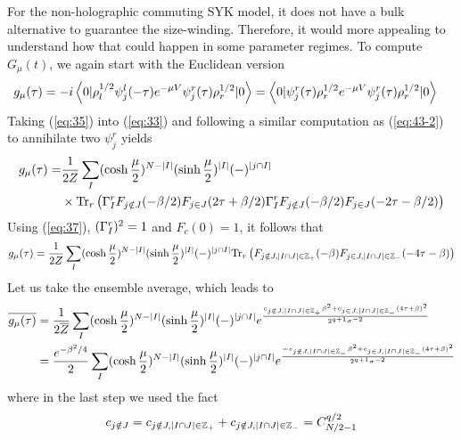 \documentclass[11pt]{article}
\renewcommand{\>}{\rangle}
\newcommand{\<}{\langle}
\begin{document}
For the non-holographic commuting SYK model, it does not have a bulk
alternative to guarantee the size-winding. Therefore, it would more
appealing to understand how that could happen in some parameter regimes.
To compute $G_{\mu}(t)$, we again start with the Euclidean version
\begin{align}
g_{\mu}(\tau) & =-i\left\langle 0|\rho_{l}^{1/2}\psi_{j}^{l}(-\tau)e^{-\mu V}\psi_{j}^{r}(\tau)\rho_{r}^{1/2}|0\right\rangle=\left\langle 0|\psi_{j}^{r}(\tau)\rho_{r}^{1/2}e^{-\mu V}\psi_{j}^{r}(\tau)\rho_{r}^{1/2}|0\right\rangle\label{eq:33}
\end{align}
Taking (\ref{eq:35}) into (\ref{eq:33}) and following a similar
computation as (\ref{eq:43-2}) to annihilate two $\psi_{j}^{r}$
yields
\begin{align}
g_{\mu}(\tau)= & \frac{1}{2Z}\sum_{I}(\cosh\frac{\mu}{2})^{N-|I|}(\sinh\frac{\mu}{2})^{|I|}(-)^{|j\cap I|}\nonumber \\
 & \times\text{Tr}_{r}\left(\Gamma_{I}^{r}F_{j\notin J}(-\beta/2)F_{j\in J}(2\tau+\beta/2)\Gamma_{I}^{r}F_{j\notin J}(-\beta/2)F_{j\in J}(-2\tau-\beta/2)\right)
\end{align}
Using (\ref{eq:37}), $(\Gamma_{I}^{r})^{2}=1$ and $F_{c}(0)=1$, it
follows that
\begin{equation}
g_{\mu}(\tau)=\frac{1}{2Z}\sum_{I}(\cosh\frac{\mu}{2})^{N-|I|}(\sinh\frac{\mu}{2})^{|I|}(-)^{|j\cap I|}\text{Tr}_{r}\left(F_{j\notin J,|I\cap J|\in\mathbb{Z}_{+}}(-\beta)F_{j\in J,|I\cap J|\in\mathbb{Z}_{-}}(-4\tau-\beta)\right)
\end{equation}
Let us take the ensemble average, which leads to
\begin{align}
\overline{g_{\mu}(\tau)} & =\frac{1}{2\overline{Z}}\sum_{I}(\cosh\frac{\mu}{2})^{N-|I|}(\sinh\frac{\mu}{2})^{|I|}(-)^{|j\cap I|}e^{\frac{c_{j\notin J,|I\cap J|\in\mathbb{Z}_{+}}\beta^{2}+c_{j\in J,|I\cap J|\in\mathbb{Z}_{-}}(4\tau+\beta)^{2}}{2^{q+1}\sigma^{-2}}}\nonumber \\
 & =\frac{e^{-\beta^{2}/4}}{2}\sum_{I}(\cosh\frac{\mu}{2})^{N-|I|}(\sinh\frac{\mu}{2})^{|I|}(-)^{|j\cap I|}e^{\frac{-c_{j\notin J,|I\cap J|\in\mathbb{Z}_{-}}\beta^{2}+c_{j\in J,|I\cap J|\in\mathbb{Z}_{-}}(4\tau+\beta)^{2}}{2^{q+1}\sigma^{-2}}}\label{eq:40-1}
\end{align}
where in the last step we used the fact
\begin{equation}
c_{j\notin J}=c_{j\notin J,|I\cap J|\in\mathbb{Z}_{+}}+c_{j\notin J,|I\cap J|\in\mathbb{Z}_{-}}=C_{N/2-1}^{q/2}
\end{equation}
\end{document}
